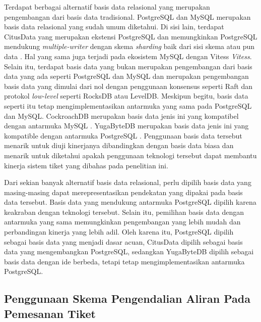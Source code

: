 Terdapat berbagai alternatif basis data relasional yang merupakan pengembangan dari basis data tradisional. PostgreSQL dan MySQL merupakan basis data relasional yang sudah umum diketahui. Di sisi lain, terdapat CitusData yang merupakan ekstensi PostgreSQL dan memungkinkan PostgreSQL mendukung \textit{multiple-writer} dengan skema \textit{sharding} baik dari sisi skema atau pun data \parencite{citus}. Hal yang sama juga terjadi pada ekosistem MySQL dengan Vitess \textit{Vitess}. Selain itu, terdapat basis data yang bukan merupakan pengembangan dari basis data yang ada seperti PostgreSQL dan MySQL dan merupakan pengembangan basis data yang dimulai dari nol dengan penggunaan konsensus seperti Raft dan protokol \textit{low-level} seperti RocksDB atau LevelDB. Meskipun begitu, basis data seperti itu tetap mengimplementasikan antarmuka yang sama pada PostgreSQL dan MySQL. CockroachDB merupakan basis data jenis ini yang kompatibel dengan antarmuka MySQL \parencite{cockroachDB}. YugaByteDB merupakan basis data jenis ini yang kompatible dengan antarmuka PostgreSQL \parencite{yugabyte}. Penggunaan basis data tersebut menarik untuk diuji kinerjanya dibandingkan dengan basis data biasa dan menarik untuk diketahui apakah penggunaan teknologi tersebut dapat membantu kinerja sistem tiket yang dibahas pada penelitian ini.

Dari sekian banyak alternatif basis data relasional, perlu dipilih basis data yang masing-masing dapat merepresentasikan pendekatan yang dipakai pada basis data tersebut. Basis data yang mendukung antarmuka PostgreSQL dipilih karena keakraban dengan teknologi tersebut. Selain itu, pemilihan basis data dengan antarmuka yang sama memungkinkan pengembangan yang lebih mudah dan perbandingan kinerja yang lebih adil. Oleh karena itu, PostgreSQL dipilih sebagai basis data yang menjadi dasar acuan, CitusData dipilih sebagai basis data yang mengembangkan PostgreSQL, sedangkan YugaByteDB dipilih sebagai basis data dengan ide berbeda, tetapi tetap mengimplementasikan antarmuka PostgreSQL.

\subsection{Penggunaan Skema Pengendalian Aliran Pada Pemesanan Tiket}

